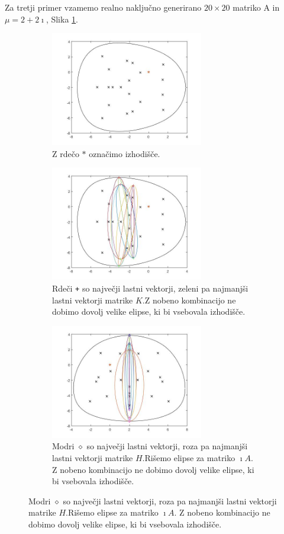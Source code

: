 \documentclass[12pt,a4paper]{amsart}
\theoremstyle{definition}
\theoremstyle{plain}
\begin{document}
Za tretji primer vzamemo realno naključno generirano $20\times 20$ matriko A in $\mu = 2 + 2\imath$, Slika \ref{fig:p51}.
\begin{figure}[H]
\begin{subfigure}[t]{0.45\textwidth}
\includegraphics[width=0.9\linewidth,height=5cm]{RC3.jpg}
\caption{Z rdečo $\ast$ označimo izhodišče.}
\label{fig:p51}
\end{subfigure}%
\hfill
\begin{subfigure}[t]{0.45\textwidth}
\includegraphics[width=0.9\linewidth,height=5cm]{RC3e1.jpg}
\caption{Rdeči \verb~+~ so največji lastni vektorji, zeleni pa najmanjši lastni vektorji matrike $K$.\footnotemark[\value{footnote}] Z nobeno kombinacijo ne dobimo dovolj velike elipse, ki bi vsebovala izhodišče.}
\label{fig:p52}
\end{subfigure}
\begin{subfigure}[t]{0.45\textwidth}
\includegraphics[width=0.9\linewidth,height=5cm]{RC3e2.jpg}
\caption{Modri $\diamond$ so največji lastni vektorji, roza pa najmanjši lastni vektorji matrike $H$.\footnotemark[\value{footnote}] Rišemo elipse za matriko $\imath A$. Z nobeno kombinacijo ne dobimo dovolj velike elipse, ki bi vsebovala izhodišče.}

\end{subfigure}
\end{figure}
\end{document}
